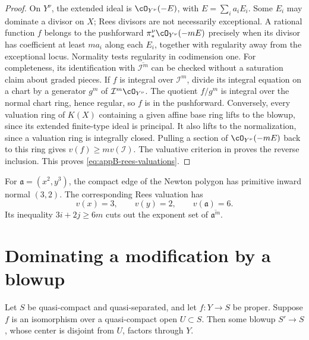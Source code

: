 \begin{proof}
On \(Y^\nu\), the extended ideal is
\(\cO_{Y^\nu}(-E)\), with
\(E=\sum_i a_iE_i\).  Some \(E_i\) may dominate a divisor on \(X\);
Rees divisors are not necessarily exceptional.  A rational function \(f\)
belongs to the pushforward
\(\pi^\nu_*\cO_{Y^\nu}(-mE)\) precisely when its divisor has coefficient at
least \(ma_i\) along each \(E_i\), together with regularity away from the
exceptional locus.  Normality tests regularity in codimension one.
For completeness, its identification with
\(\overline{\mathcal I^m}\) can be checked without a saturation claim
about graded pieces.  If \(f\) is integral over \(\mathcal I^m\), divide
its integral equation on a chart by a generator \(g^m\) of
\(\mathcal I^m\cO_{Y^\nu}\).  The quotient \(f/g^m\) is integral over
the normal chart ring, hence regular, so \(f\) is in the pushforward.
Conversely, every valuation ring of \(K(X)\) containing a given affine
base ring lifts to the blowup, since its extended finite-type ideal is
principal.  It also lifts to the normalization, since a valuation ring
is integrally closed.  Pulling a section of \(\cO_{Y^\nu}(-mE)\) back
to this ring gives \(v(f)\geq m v(\mathcal I)\).  The valuative
criterion in  proves the reverse
inclusion.  This proves \eqref{eq:appB-rees-valuations}.
\end{proof}

\begin{example}
\label{ex:appB-monomial-rees}
For \(\mathfrak a=(x^2,y^3)\), the compact edge of the Newton polygon has
primitive inward normal \((3,2)\).  The corresponding Rees valuation has
\[
 v(x)=3,\qquad v(y)=2,\qquad v(\mathfrak a)=6.
\]
Its inequality \(3i+2j\geq6m\) cuts out the exponent set of
\(\overline{\mathfrak a^m}\).
\end{example}

\section{Dominating a modification by a blowup}
\label{sec:appB-domination-blowup}

\begin{theorem}\label{thm:appB-admissible-domination}
Let \(S\) be quasi-compact and quasi-separated, and let
\(f:Y\to S\) be proper.  Suppose \(f\) is an isomorphism over a
quasi-compact open \(U\subset S\).  Then some blowup
\(S'\to S\), whose center is disjoint from \(U\), factors through \(Y\).
\end{theorem}

